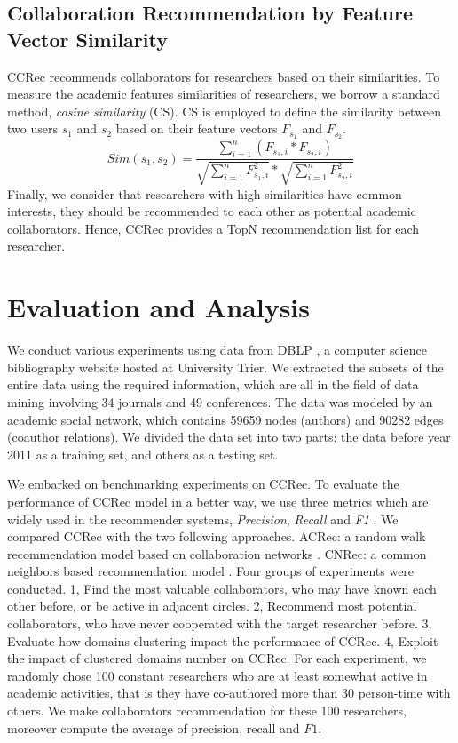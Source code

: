 \documentclass{acm_proc_article-sp}
\begin{document}
\subsection{Collaboration Recommendation by Feature Vector Similarity}
CCRec recommends collaborators for researchers based on their similarities. To measure the academic features similarities of researchers, we borrow a standard method, \emph{cosine similarity} (CS). CS is employed to define the similarity between two users $s_{1}$ and $s_{2}$ based on their feature vectors $F_{s_{1}}$ and $F_{s_{2}}$.
\begin{equation}
Sim(s_{1},s_{2})=\frac{\sum_{i=1}^{n}(F_{s_{1},i}*F_{s_{2},i})}{\sqrt{\sum_{i=1}^{n}F_{s_{1},i}^2}*\sqrt{\sum_{i=1}^{n}F_{s_{2},i}^2}}
\end{equation}
Finally, we consider that researchers with high similarities have common interests, they should be recommended to each other as potential academic collaborators. Hence, CCRec provides a TopN recommendation list for each researcher.

\section{Evaluation and Analysis}
We conduct various experiments using data from DBLP \cite{Ley:DBLP}, a computer science bibliography website hosted at University Trier. We extracted the subsets of the entire data using the required information, which are all in the field of data mining involving 34 journals and 49 conferences. The data was modeled by an academic social network, which contains 59659 nodes (authors) and 90282 edges (coauthor relations). We divided the data set into two parts: the data before year 2011 as a training set, and others as a testing set.

We embarked on benchmarking experiments on CCRec. To evaluate the performance of CCRec model in a better way, we use three metrics which are widely used in the recommender systems, \emph{Precision}, \emph{Recall} and \emph{F1} \cite{shani2011evaluating}. We compared CCRec with the two following approaches. ACRec: a random walk recommendation model based on collaboration networks \cite{li2014acrec}. CNRec: a common neighbors based recommendation model \cite{lopes2010collaboration}. Four groups of experiments were conducted. 1, Find the most valuable collaborators, who may have known each other before, or be active in adjacent circles. 2, Recommend most potential collaborators, who have never cooperated with the target researcher before. 3, Evaluate how domains clustering impact the performance of CCRec. 4, Exploit the impact of clustered domains number on CCRec. For each experiment, we randomly chose 100 constant researchers who are at least somewhat active in academic activities, that is they have co-authored more than 30 person-time with others. We make collaborators recommendation for these 100 researchers, moreover compute the average of precision, recall and $F1$.
\end{document}
